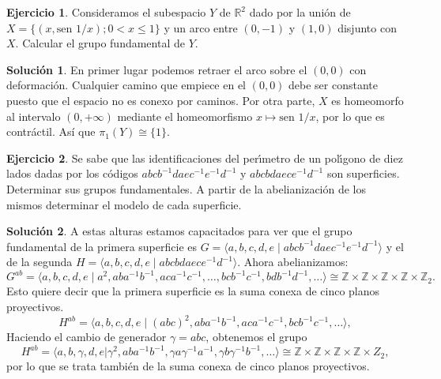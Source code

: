 \documentclass{article}
\theoremstyle{plain}
\theoremstyle{definition}
\newtheorem{exercise}{Ejercicio}
\newtheorem*{sol*}{Solución}
\newcommand{\Z}{\mathbb{Z}}
\begin{document}
\begin{exercise}

Consideramos el subespacio $Y$ de $\mathbb{R}^2$ dado por la uni\'on de $X=\{(x,\textrm{sen }1/x);0<x\leq 1\}$ y un arco entre $(0,-1)$ y $(1,0)$ disjunto con $X$. Calcular el grupo fundamental de $Y$.

\end{exercise}
\begin{sol*}
En primer lugar podemos retraer el arco sobre el $(0,0)$ con deformación. Cualquier camino que empiece en el $(0,0)$ debe ser constante puesto que el espacio no es conexo por caminos. Por otra parte, $X$ es homeomorfo al intervalo $(0,+\infty)$ mediante el homeomorfismo $x\mapsto\textrm{sen }1/x$, por lo que es contráctil. Así que $\pi_1(Y)\cong\{1\}$.
\end{sol*}

\newpage

\begin{exercise}
Se sabe que las identificaciones del per\'{\i}metro de  un pol\'{\i}gono de diez lados dadas por los c\'odigos $abcb^{-1}daec^{-1}e^{-1}d^{-1}$ y $abcbdaece^{-1}d^{-1}$ son
superficies. Determinar sus grupos fundamentales. A partir de la abelianizaci\'on de los mismos determinar el modelo de cada superficie.
\end{exercise}
\begin{sol*}
A estas alturas estamos capacitados para ver que el grupo fundamental de la primera superficie es $G=\langle a,b,c,d,e\mid abcb^{-1}daec^{-1}e^{-1}d^{-1}\rangle$ y el de la segunda $H=\langle a,b,c,d,e\mid abcbdaece^{-1}d^{-1}\rangle$. Ahora abelianizamos:
\[
G^{ab}=\langle a,b,c,d,e\mid a^2,aba^{-1}b^{-1},aca^{-1}c^{-1},\dots,bcb^{-1}c^{-1},bdb^{-1}d^{-1},\dots\rangle\cong\Z\times\Z\times\Z\times\Z\times\Z_2.
\]
Esto quiere decir que la primera superficie es la suma conexa de cinco planos proyectivos. 
\[
H^{ab}=\langle a,b,c,d,e \mid (abc)^2,aba^{-1}b^{-1},aca^{-1}c^{-1},bcb^{-1}c^{-1},\dots\rangle,
\]
Haciendo el cambio de generador $\gamma=abc$, obtenemos el grupo 
\[
H^{ab}=\langle a,b,\gamma,d,e|\gamma^2,aba^{-1}b^{-1},\gamma a\gamma^{-1}a^{-1},\gamma b\gamma^{-1}b^{-1},\dots\rangle\cong\Z\times\Z\times\Z\times\Z\times Z_2,
\] por lo que se trata también de la suma conexa de cinco planos proyectivos.
\end{sol*}

\newpage
\end{document}
